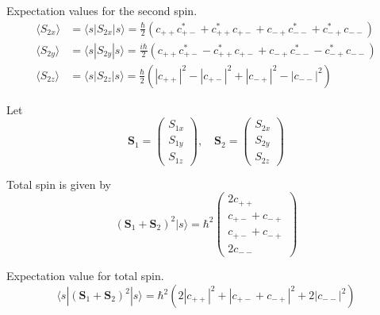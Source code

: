 Expectation values for the second spin.
\begin{align*}
\langle S_{2x}\rangle&=\langle s|S_{2x}|s\rangle
=\tfrac{\hbar}{2}
\left(c_{++}c_{+-}^*+c_{++}^*c_{+-}+c_{-+}c_{--}^*+c_{-+}^*c_{--}\right)
\\
\langle S_{2y}\rangle&=\langle s|S_{2y}|s\rangle
=\tfrac{i\hbar}{2}
\left(c_{++}c_{+-}^*-c_{++}^*c_{+-}+c_{-+}c_{--}^*-c_{-+}^*c_{--}\right)
\\
\langle S_{2z}\rangle&=\langle s|S_{2z}|s\rangle
=\tfrac{\hbar}{2}\left(|c_{++}|^2-|c_{+-}|^2+|c_{-+}|^2-|c_{--}|^2\right)
\end{align*}

Let
\begin{equation*}
\mathbf S_1=\begin{pmatrix}S_{1x}\\S_{1y}\\S_{1z}\end{pmatrix},\quad
\mathbf S_2=\begin{pmatrix}S_{2x}\\S_{2y}\\S_{2z}\end{pmatrix}
\end{equation*}

Total spin is given by
\begin{equation*}
(\mathbf S_1+\mathbf S_2)^2|s\rangle
=\hbar^2\begin{pmatrix}2c_{++}\\c_{+-}+c_{-+}\\c_{+-}+c_{-+}\\2c_{--}\end{pmatrix}
\end{equation*}

Expectation value for total spin.
\begin{equation*}
\langle s|(\mathbf S_1+\mathbf S_2)^2|s\rangle
=\hbar^2\left(2|c_{++}|^2+|c_{+-}+c_{-+}|^2+2|c_{--}|^2\right)
\end{equation*}

\newpage
{}

